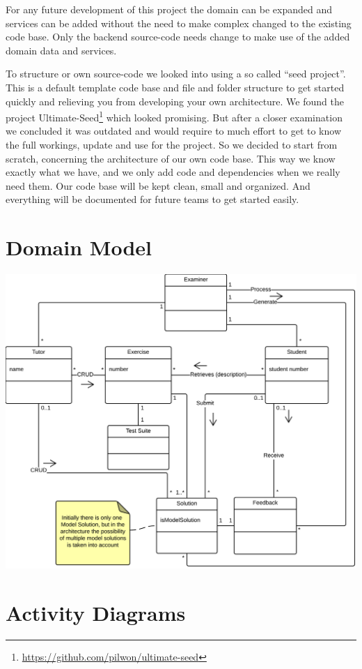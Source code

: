 For any future development of this project
the domain can be expanded
and services can be added
without the need to make complex changed to the existing code base.
Only the backend \gls{source-code} needs change
to make use of the added domain data and services.

To structure or own \gls{source-code}
we looked into using a so called ``seed project''.
This is a default template code base and file and folder structure
to get started quickly and relieving you from developing your own architecture.
We found the project
Ultimate-Seed\footnote{\url{https://github.com/pilwon/ultimate-seed}}
which looked promising.
But after a closer examination we concluded it was outdated
and would require to much effort to get to know the full workings,
update and use for the \gls{project}.
So we decided to start from scratch,
concerning the architecture of our own code base.
This way we know exactly what we have,
and we only add code and dependencies when we really need them.
Our code base will be kept clean, small and organized.
And everything will be documented for future teams to get started easily.


\section{Domain Model}
\includegraphics[scale=0.8]{diagrams-images/domain-model}



\section{Activity Diagrams}
